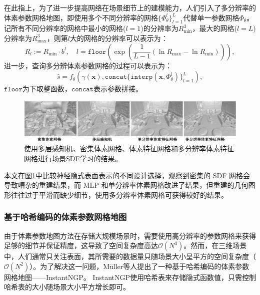 在此指上，为了进一步提高网络在场景细节上的建模能力，人们引入了多分辨率的体素参数网格地图\cite{yu_monosdf_2022}，即使用多个不同分辨率的网格$\{\Phi^l_\theta\}^L_{l=1}$代替单一参数网格$\Phi_\theta$。记所有不同分辨率的网格中最小的网格($l=1$)的分辨率为$R_{\min}^3$，最大的网格($l=L$)分辨率为$R_{\max}^3$，则第$l$大的网格的分辨率可以表示为：
\begin{equation}
    R_l:=R_{\min}\cdot b^l, \quad l=\mathtt{floor}(\exp(\frac{1}{L - 1}(\ln R_{\max} - \ln R_{\min}))),
\end{equation}
进一步，查询多分辨体素参数网格的过程可以表示为：
\begin{equation}
    \hat{s} = f_\theta(\gamma(\mathbf{x}), \mathtt{concat}\{\mathtt{interp}(\mathbf{x}, \Phi_\theta^l)\}_{l=1}^L),
\end{equation}
$\mathtt{floor}$为下取整函数，$\mathtt{concat}$表示参数拼接。

\begin{figure}[ht]
    \centering
    \includegraphics[width=\textwidth]{undergraduate-thesis/images/related-work/monosdf-result.pdf}
    \caption{使用多层感知机、密集体素网格、体素特征网格和多分辨率体素特征网格进行场景SDF学习的结果\cite{yu_monosdf_2022}。}
    \label{fig:related-work monosdf result}
\end{figure}

本文在图\ref{fig:related-work monosdf result}中比较神经隐式表面表示的不同设计选择，观察到密集的 SDF 网格会导致嘈杂的重建结果，而 MLP 和单分辨率体素网格改进了结果，但重建的几何图形往往过于平滑而缺少细节，使用多分辨率体素网格可获得较好的结果。

\subsubsection{基于哈希编码的体素参数网格地图}
由于体素参数地图方法在存储大规模场景时，需要使用高分辨率的参数网格来获得足够的细节并保证精度，这导致了空间复杂度高达$\mathcal{O}(N^3)$。然而，在三维场景中，人们通常只关注表面，其所需要的数据量只随场景大小呈平方的空间复杂度（$\mathcal{O}(N^2)$）。为了解决这一问题，M\"uller等人提出了一种基于哈希编码的体素参数网格地图——InstantNGP\cite{muller_instant_2022}。 InstantNGP使用哈希表来存储隐式函数值，只需控制哈希表的大小随场景大小平方增长即可。

